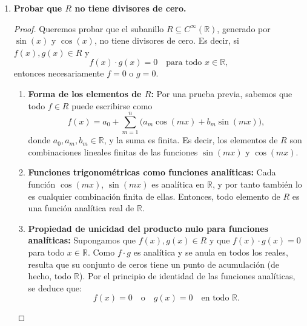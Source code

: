 \begin{ejemplo}
{\begin{enumerate}
\begin{proof}
			Estas identidades muestran que todo producto de funciones trigonométricas de múltiplos de \( x \) puede ser reescrito como combinación lineal finita de \( \cos(kx), \sin(kx) \).
			
			\medskip
			\textbf{Conclusión:}
			
			Cualquier elemento \( f \in R \) se escribe como suma finita de productos finitos de \( \cos(kx), \sin(kx) \), y por lo anterior, estas se reducen a combinación lineal finita de funciones del tipo:
			\[
			\{ \cos(mx), \sin(mx) \mid m \in \mathbb{N} \} \cup \{1\}.
			\]
			Por tanto,
			\[
			f(x) = a_0 + \sum_{m=1}^{n} \bigl(a_m \cos(mx) + b_m \sin(mx)\bigr),
			\]
			para ciertos \( a_0, a_m, b_m \in \mathbb{R} \), y algún \( n \in \mathbb{N} \). Esto concluye la prueba.
		\end{proof}
		
		\item \textbf{Probar que \( R \) no tiene divisores de cero.}
		
			
		\begin{proof}
			Queremos probar que el subanillo \( R \subseteq C^\infty(\mathbb{R}) \), generado por \( \sin(x) \) y \( \cos(x) \), no tiene divisores de cero. Es decir, si \( f(x), g(x) \in R \) y 
			\[
			f(x) \cdot g(x) = 0 \quad \text{para todo } x \in \mathbb{R},
			\]
			entonces necesariamente \( f = 0 \) o \( g = 0 \).
			
			\begin{enumerate}
				\item \textbf{Forma de los elementos de \( R \):}  
				Por una prueba previa, sabemos que todo \( f \in R \) puede escribirse como
				\[
				f(x) = a_0 + \sum_{m=1}^n \bigl(a_m \cos(mx) + b_m \sin(mx)\bigr),
				\]
				donde \( a_0, a_m, b_m \in \mathbb{R} \), y la suma es finita. Es decir, los elementos de \( R \) son combinaciones lineales finitas de las funciones \( \sin(mx) \) y \( \cos(mx) \).
				
				\item \textbf{Funciones trigonométricas como funciones analíticas:}  
				Cada función \( \cos(mx) \), \( \sin(mx) \) es analítica en \( \mathbb{R} \), y por tanto también lo es cualquier combinación finita de ellas. Entonces, todo elemento de \( R \) es una función analítica real de \( \mathbb{R} \).
				
				\item \textbf{Propiedad de unicidad del producto nulo para funciones analíticas:}  
				Supongamos que \( f(x), g(x) \in R \) y que \( f(x)\cdot g(x) = 0 \) para todo \( x \in \mathbb{R} \). Como \( f \cdot g \) es analítica y se anula en todos los reales, resulta que su conjunto de ceros tiene un punto de acumulación (de hecho, todo \( \mathbb{R} \)). Por el principio de identidad de las funciones analíticas, se deduce que:
				\[
				f(x) = 0 \quad \text{o} \quad g(x) = 0 \quad \text{en todo } \mathbb{R}.
				\]
				

\end{enumerate}
\end{proof}
\end{enumerate}}
\end{ejemplo}
